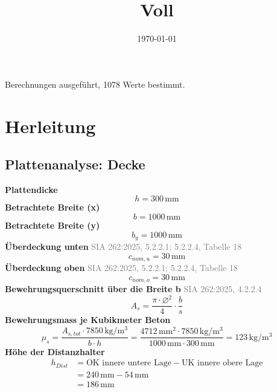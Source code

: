 \documentclass[11pt,a4paper]{article}
\title{Voll}
\author{}
\date{\today}
\newcommand{\normref}[1]{{\small\textcolor{gray}{#1}}}
\begin{document}
 Berechnungen ausgeführt, 1078 Werte bestimmt.

\section{Herleitung}
\subsection{Plattenanalyse: Decke}
\noindent\textbf{Plattendicke}
\begin{equation*}
h = 300\,\mathrm{mm}
\end{equation*}
\noindent\textbf{Betrachtete Breite (x)}
\begin{equation*}
b = 1000\,\mathrm{mm}
\end{equation*}
\noindent\textbf{Betrachtete Breite (y)}
\begin{equation*}
b_y = 1000\,\mathrm{mm}
\end{equation*}
\noindent\textbf{Überdeckung unten} \hfill \normref{SIA 262:2025, 5.2.2.1; 5.2.2.4, Tabelle 18}
\begin{equation*}
c_{nom,u} = 30\,\mathrm{mm}
\end{equation*}
\noindent\textbf{Überdeckung oben} \hfill \normref{SIA 262:2025, 5.2.2.1; 5.2.2.4, Tabelle 18}
\begin{equation*}
c_{nom,o} = 30\,\mathrm{mm}
\end{equation*}
\noindent\textbf{Bewehrungsquerschnitt über die Breite b} \hfill \normref{SIA 262:2025, 4.2.2.4}
\begin{equation*}
A_s = \frac{\pi \cdot \varnothing^{2}}{4} \cdot \frac{b}{s}
\end{equation*}
\noindent\textbf{Bewehrungsmass je Kubikmeter Beton}
\begin{equation*}
\mu_s = \frac{A_{s,tot} \cdot 7850\,\mathrm{kg}/\mathrm{m}^{3}}{b \cdot h} = \frac{4712\,\mathrm{mm}^{2} \cdot 7850\,\mathrm{kg}/\mathrm{m}^{3}}{1000\,\mathrm{mm} \cdot 300\,\mathrm{mm}} = 123\,\mathrm{kg}/\mathrm{m}^{3}
\end{equation*}
\noindent\textbf{Höhe der Distanzhalter}
\begin{equation*}
\begin{aligned}
  h_{Dist} &= \text{OK innere untere Lage} - \text{UK innere obere Lage} \\
  &= 240\,\mathrm{mm} - 54\,\mathrm{mm} \\
  &= 186\,\mathrm{mm}
\end{aligned}
\end{equation*}
\end{document}
